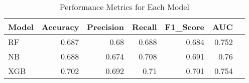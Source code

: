 \begin{table}[H]
\caption{Performance Metrics for Each Model}
\label{Table 3 :performance_metrics}
\begin{tabular}{lrrrrrr}
\toprule
Model & Accuracy & Precision & Recall & F1\_Score & AUC \\
\midrule
RF & 0.687 & 0.68 & 0.688 & 0.684 & 0.752 \\
NB & 0.688 & 0.674 & 0.708 & 0.691 & 0.76 \\
XGB & 0.702 & 0.692 & 0.71 & 0.701 & 0.754 \\
\bottomrule
\end{tabular}
\end{table}
